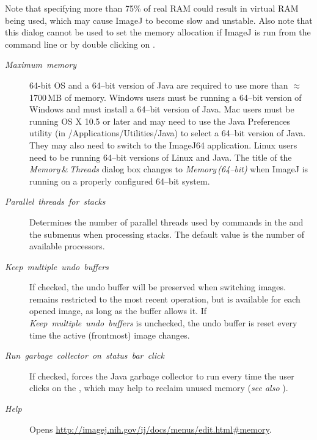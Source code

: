 Note that specifying more than 75\% of real RAM
could result in virtual RAM being used, which may cause ImageJ to
become slow and unstable. Also note that this dialog cannot be used
to set the memory allocation if ImageJ is run from the command line
or by double clicking on .
\begin{description}
\item [{\emph{Maximum}\ \emph{memory}}] 64-bit
OS and a 64--bit version of Java are required to use
more than $\approx$1700\,MB of memory. Windows users must be running
a 64--bit version of Windows and must install a 64--bit version of
Java. Mac users must be running OS X 10.5 or later and may need to
use the Java Preferences utility (in /Applications/Utilities/Java)
to select a 64--bit version of Java. They may also need to switch
to the ImageJ64 application. Linux users need to be running 64--bit
versions of Linux and Java. The title of the \emph{Memory}\,\&\,\emph{Threads}
dialog box changes to \emph{Memory}\,\emph{(64--bit)} when ImageJ
is running on a properly configured 64--bit system.
\item [{\emph{Parallel}\ \emph{threads}\ \emph{for}\ \emph{stacks}}] Determines
the number of parallel threads used by commands in the 
and the  submenus
when processing stacks. The default value is the number of available
processors.
\item [{\emph{Keep\ multiple\ undo\ buffers}}] If checked, the undo
buffer will be preserved when switching images. 
remains restricted to the most recent operation, but is available
for each opened image, as long as the buffer allows it. If \emph{Keep\ multiple\ undo\ buffers}
is unchecked, the undo buffer is reset every time the active (frontmost)
image changes.
\item [{\emph{Run\ garbage\ collector\ on\ status\ bar\ click}}] If
checked, forces the Java garbage collector to run every time the user
clicks on the , which may help to reclaim
unused memory (\emph{see also} \textsf{}).
\item [{\emph{Help}}] Opens \url{http://imagej.nih.gov/ij/docs/menus/edit.html#memory}.
\end{description}

